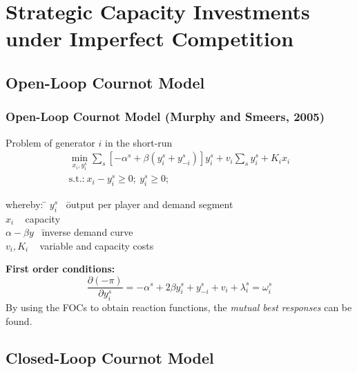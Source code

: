 \section{Strategic Capacity Investments under Imperfect Competition}

\subsection{Open-Loop Cournot Model}

\begin{frame}

\frametitle{Open-Loop Cournot Model (Murphy and Smeers, 2005)}

\begin{beamerboxesrounded}
{Problem of generator $i$ in the \alert{short-run}}
\begin{gather}
	\min_{x_i,y_i^s} \sum_s \left[ - \alpha^s + \beta (y_i^s+y_{-i}^s) \right] y_i^s + v_i \sum_s y_i^s + K_i x_i \\
\text{s.t.:} \  x_i-y_i^s \geq 0; \  y_i^s \geq 0; \ \nonumber
\end{gather}
{\small
\begin{tabbing}
whereby: \= $y_i^s$ \  \= output per player and demand segment \\
\> $x_i$   \    \> capacity  \\
\> $\alpha - \beta y$    \   \= inverse demand curve \\
\> $v_i, K_i$    \    \> variable and capacity costs
\end{tabbing}}
\end{beamerboxesrounded}
\vspace{0.3cm}
\textbf{First order conditions:}
\begin{equation}
	\frac{\partial (- \pi)}{\partial y_i^s} = -\alpha^s + 2 \beta y_i^s +  y_{-i}^s + v_i + \lambda_i^s = \omega_i^s 
\end{equation}
By using the FOCs to obtain reaction functions, the \emph{mutual best responses} can be found.
\end{frame}

\subsection{Closed-Loop Cournot Model}

